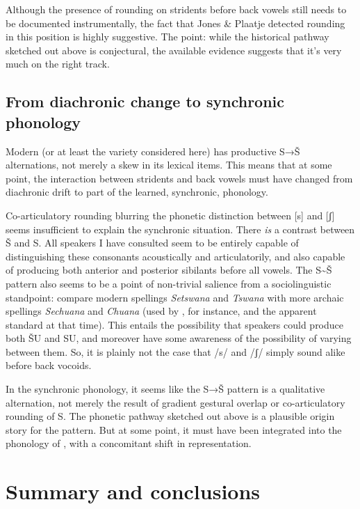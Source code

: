 \documentclass[output=paper,newtxmath,modfonts,nonflat,hidelinks]{langsci/langscibook}
\begin{document}
Although the presence of rounding on stridents before back vowels still needs to be documented instrumentally, the fact that Jones \& Plaatje detected rounding in this position is highly suggestive. The point: while the historical pathway sketched out above is conjectural, the available evidence suggests that it’s very much on the right track.

\subsection{From diachronic change to synchronic phonology}\label{sec:bennett:4.3}

Modern  (or at least the variety considered here) has productive S→Š alternations, not merely a skew in its lexical items. This means that at some point, the interaction between stridents and back vowels must have changed from diachronic drift to part of the learned, synchronic, phonology.

Co-articulatory rounding blurring the phonetic distinction between [s] and [ʃ] seems insufficient to explain the synchronic situation. There \textit{is} a contrast between Š and S. All  speakers I have consulted seem to be entirely capable of distinguishing these consonants acoustically and articulatorily, and also capable of producing both anterior and posterior sibilants before all vowels. The S{\textasciitilde}Š pattern also seems to be a point of non-trivial salience from a sociolinguistic standpoint: compare modern spellings \textit{Setswana} and \textit{Tswana} with more archaic spellings \textit{Sechuana} and \textit{Chuana} (used by \citet{Jones&Plaatje1916}, for instance, and the apparent standard at that time).  This entails the possibility that speakers could produce both ŠU and SU, and moreover have some awareness of the possibility of varying between them. So, it is plainly not the case that /s/ and /ʃ/ simply sound alike before back vocoids.

In the synchronic phonology, it seems like the S→Š pattern is a qualitative alternation, not merely the result of gradient gestural overlap or co-articulatory rounding of S. The phonetic pathway sketched out above is a plausible origin story for the pattern. But at some point, it must have been integrated into the phonology of , with a concomitant shift in representation.

\section{Summary and conclusions}\label{sec:bennett:5}
\end{document}
